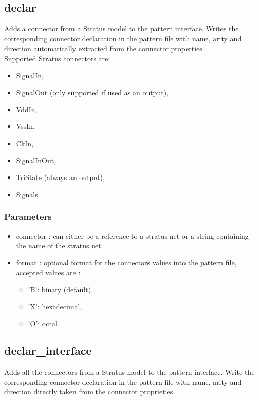 \documentclass[12pt]{article}
\begin{document}
\subsection{declar}
\label{declar}
Adds a connector from a Stratus model to the pattern interface. Writes the 
corresponding connector declaration in the pattern file with name, arity and 
direction automatically extracted from the connector properties.\\
Supported Stratus connectors are:
\begin{itemize}
\item{SignalIn,}
\item{SignalOut (only supported if used as an output),}
\item{VddIn,}
\item{VssIn,}
\item{CkIn,}
\item{SignalInOut,}
\item{TriState (always an output),}
\item{Signals.}
\end{itemize}

\subsubsection{Parameters}
\begin{itemize}
\item{connector : can either be a reference to a stratus net or a string 
containing the name of the stratus net.}
\item{format : optional format for the connectors values into the pattern file, 
accepted values are :}
   \begin{itemize}
   \item{'B': binary (default),}
   \item{'X': hexadecimal,}
   \item{'O': octal.}
   \end{itemize}
\end{itemize}

\subsection{declar\_interface}
\label{declar_interface}
Adds all the connectors from a Stratus model to the pattern interface. Write 
the corresponding connector declaration in the pattern file with name, arity 
and direction directly taken from the connector proprieties.\\
\end{document}
